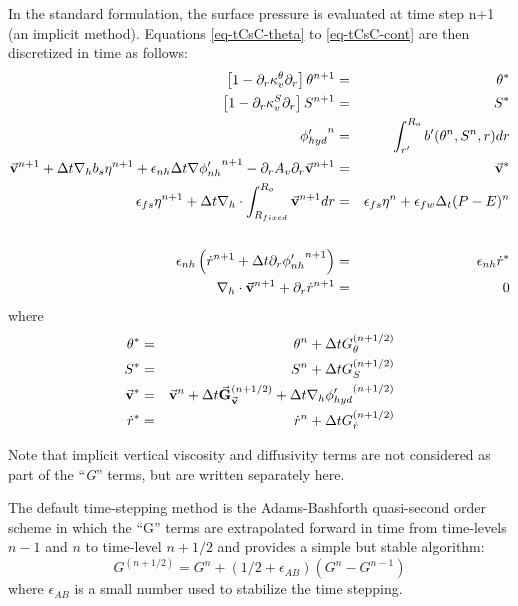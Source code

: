 In the standard formulation, the surface pressure is evaluated at time
step n+1 (an implicit method).  Equations \ref{eq-tCsC-theta} to
\ref{eq-tCsC-cont} are then discretized in time as follows:
\begin{eqnarray}
\left[ 1 - \partial_r \kappa_v^\theta \partial_r \right]
\theta^{n+1} & = & \theta^*
\label{eq-tDsC-theta}
\\
\left[ 1 - \partial_r \kappa_v^S \partial_r \right]
S^{n+1} & = & S^*
\label{eq-tDsC-salt}
\\
{\phi'_{hyd}}^{n} & = & \int_{r'}^{R_o} b'(\theta^{n},S^{n},r) dr
\label{eq-tDsC-hyd}
\\
\vec{\bf v} ^{n+1}
+ \Delta t {\bf \nabla}_h b_s {\eta}^{n+1}
+ \epsilon_{nh} \Delta t {\bf \nabla} {\phi'_{nh}}^{n+1}
- \partial_r A_v \partial_r \vec{\bf v}^{n+1}
& = &
\vec{\bf v}^*
\label{eq-tDsC-Hmom}
\\
\epsilon_{fs} {\eta}^{n+1} + \Delta t
{\bf \nabla}_h \cdot \int_{R_{fixed}}^{R_o} \vec{\bf v}^{n+1} dr
& = & 
    \epsilon_{fs} {\eta}^{n} + \epsilon_{fw} \Delta_t (P-E)^{n} 
\nonumber
\\
\label{eq-tDsC-eta}
\\
\epsilon_{nh} \left( \dot{r} ^{n+1}
+ \Delta t \partial_r {\phi'_{nh}} ^{n+1}
\right)
& = & \epsilon_{nh} \dot{r}^*
\label{eq-tDsC-Vmom}
\\
{\bf \nabla}_h \cdot \vec{\bf v}^{n+1} + \partial_r \dot{r}^{n+1}
& = & 0
\label{eq-tDsC-cont}
\end{eqnarray}
where
\begin{eqnarray}
\theta^* & = &
\theta ^{n} + \Delta t G_{\theta} ^{(n+1/2)}
\\
S^* & = &
S ^{n} + \Delta t G_{S} ^{(n+1/2)}
\\
\vec{\bf v}^* & = &
\vec{\bf v}^{n} + \Delta t \vec{\bf G}_{\vec{\bf v}} ^{(n+1/2)}
+ \Delta t  {\bf \nabla}_h {\phi'_{hyd}}^{(n+1/2)}
\\
\dot{r}^* & = &
\dot{r} ^{n} + \Delta t G_{\dot{r}} ^{(n+1/2)}
\end{eqnarray}

Note that implicit vertical viscosity and diffusivity terms are not
considered as part of the ``{\it G}'' terms, but are written
separately here.

The default time-stepping method is the Adams-Bashforth quasi-second
order scheme in which the ``G'' terms are extrapolated forward in time
from time-levels $n-1$ and $n$ to time-level $n+1/2$ and provides a
simple but stable algorithm:
\begin{equation}
G^{(n+1/2)} = G^n + (1/2+\epsilon_{AB}) (G^n - G^{n-1})
\end{equation}
where $\epsilon_{AB}$ is a small number used to stabilize the time
stepping.

